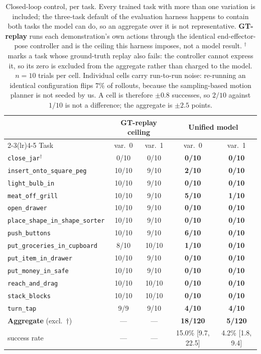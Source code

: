 \begin{table}[t]
\caption{Closed-loop control, per task. Every trained task with more than one variation is
included; the three-task default of the evaluation harness happens to contain both tasks the
model can do, so an aggregate over it is not representative.
\textbf{GT-replay} runs each demonstration's own actions through the identical
end-effector-pose controller and is the ceiling this harness imposes, not a model result.
$^{\dagger}$ marks a task whose ground-truth replay also fails: the controller cannot express
it, so its zero is excluded from the aggregate rather than charged to the model.
$n{=}10$ trials per cell. Individual cells carry run-to-run noise: re-running an
identical configuration flips $7\%$ of rollouts, because the sampling-based motion planner
is not seeded by us. A cell is therefore $\pm 0.8$ successes, so $2/10$ against $1/10$ is
not a difference; the aggregate is $\pm 2.5$ points.}
\label{tab:pertask}
\centering
\small
\begin{tabular}{lcccc}
\toprule
& \multicolumn{2}{c}{GT-replay ceiling} & \multicolumn{2}{c}{Unified model} \\
\cmidrule(lr){2-3}\cmidrule(lr){4-5}
Task & var.\ 0 & var.\ 1 & var.\ 0 & var.\ 1 \\
\midrule
\texttt{close\_jar}$^{\dagger}$ & 0/10 & 0/10 & \textbf{0/10} & \textbf{0/10} \\
\texttt{insert\_onto\_square\_peg} & 10/10 & 9/10 & \textbf{2/10} & \textbf{0/10} \\
\texttt{light\_bulb\_in} & 10/10 & 9/10 & \textbf{0/10} & \textbf{0/10} \\
\texttt{meat\_off\_grill} & 10/10 & 9/10 & \textbf{5/10} & \textbf{1/10} \\
\texttt{open\_drawer} & 10/10 & 9/10 & \textbf{0/10} & \textbf{0/10} \\
\texttt{place\_shape\_in\_shape\_sorter} & 10/10 & 9/10 & \textbf{0/10} & \textbf{0/10} \\
\texttt{push\_buttons} & 10/10 & 9/10 & \textbf{6/10} & \textbf{0/10} \\
\texttt{put\_groceries\_in\_cupboard} & 8/10 & 10/10 & \textbf{1/10} & \textbf{0/10} \\
\texttt{put\_item\_in\_drawer} & 10/10 & 9/10 & \textbf{0/10} & \textbf{0/10} \\
\texttt{put\_money\_in\_safe} & 10/10 & 9/10 & \textbf{0/10} & \textbf{0/10} \\
\texttt{reach\_and\_drag} & 10/10 & 10/10 & \textbf{0/10} & \textbf{0/10} \\
\texttt{stack\_blocks} & 10/10 & 10/10 & \textbf{0/10} & \textbf{0/10} \\
\texttt{turn\_tap} & 9/9 & 9/10 & \textbf{4/10} & \textbf{4/10} \\
\midrule
\textbf{Aggregate} (excl.\ $\dagger$) & --- & --- & \textbf{18/120} & \textbf{5/120} \\
\quad success rate & --- & --- & 15.0\% [9.7, 22.5] & 4.2\% [1.8, 9.4] \\
\bottomrule
\end{tabular}
\end{table}
